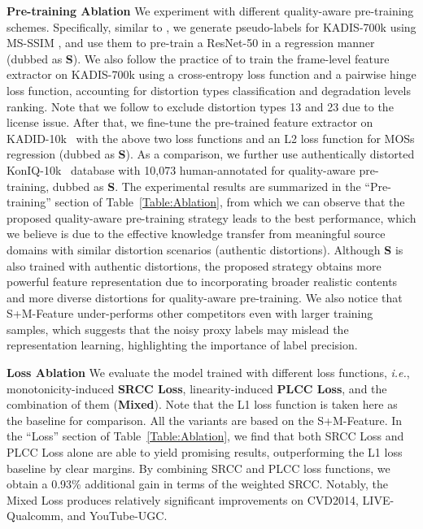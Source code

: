 \documentclass[journal]{IEEEtran}
\begin{document}
{{\textbf{Pre-training Ablation} We experiment with different quality-aware pre-training schemes. Specifically, similar to \cite{zhang2019blind}, we generate pseudo-labels for KADIS-700k \cite{lin2019kadid} using MS-SSIM \cite{wang2003multiscale}, and use them to pre-train a ResNet-50 in a regression manner (dubbed as \textbf{S}). We also follow the practice of \cite{wang2021rich} to train the frame-level feature extractor on KADIS-700k using a cross-entropy loss function and a pairwise hinge loss function, accounting for distortion types classification and degradation levels ranking. Note that we follow \cite{wang2021rich} to exclude distortion types 13 and 23 due to the license issue. After that, we fine-tune the pre-trained feature extractor on KADID-10k~\cite{lin2019kadid} with the above two loss functions and an L2 loss function for MOSs regression (dubbed as \textbf{S}). As a comparison, we further use authentically distorted KonIQ-10k~\cite{hosu2020koniq} database with 10,073 human-annotated for quality-aware pre-training, dubbed as \textbf{S}. The experimental results are summarized in the ``Pre-training'' section of Table~\ref{Table:Ablation}, from which we can observe that the proposed quality-aware pre-training strategy leads to the best performance, which we believe is due to the effective knowledge transfer from meaningful source domains with similar distortion scenarios (authentic distortions). Although \textbf{S} is also trained with authentic distortions, the proposed strategy obtains more powerful feature representation due to incorporating broader realistic contents and more diverse distortions for quality-aware pre-training. We also notice that S+M-Feature under-performs other competitors even with larger training samples, which suggests that the noisy proxy labels may mislead the representation learning, highlighting the importance of label precision.

\textbf{Loss Ablation} We evaluate the model trained with different loss functions, \textit{i.e.}, monotonicity-induced \textbf{SRCC Loss}, linearity-induced \textbf{PLCC Loss}, and the combination of them ({\bf{Mixed}}). Note that the L1 loss function is taken here as the baseline for comparison. All the variants are based on the S+M-Feature. In the ``Loss'' section of Table~\ref{Table:Ablation}, we find that both SRCC Loss and PLCC Loss alone are able to yield promising results, outperforming the L1 loss baseline by clear margins. By combining SRCC and PLCC loss functions, we obtain a 0.93\% additional gain in terms of the weighted SRCC. Notably, the Mixed Loss produces relatively significant improvements on CVD2014, LIVE-Qualcomm, and YouTube-UGC.

}}
\end{document}
